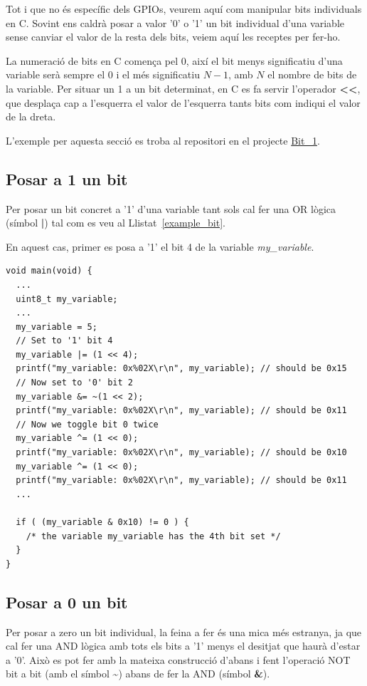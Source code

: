 Tot i que no és específic dels GPIOs, veurem aquí com manipular bits individuals en C. Sovint ens caldrà posar a valor '0' o '1' un bit individual d'una variable sense canviar el valor de la resta dels bits, veiem aquí les receptes per fer-ho.

\begin{remark}
 La numeració de bits en C comença pel 0, així el bit menys significatiu d'una variable serà sempre el 0 i el més significatiu $N-1$, amb $N$ el nombre de bits de la variable. Per situar un 1 a un bit determinat, en C es fa servir l'operador {\bf <{}<}, que desplaça cap a l'esquerra el valor de l'esquerra tants bits com indiqui el valor de la dreta.
\end{remark}

L'exemple per aquesta secció es troba al repositori en el projecte \href{https://github.com/mariusmm/cursembedded/tree/master/Simplicity/Bit_1}{Bit\_1}.
\index{|}
\subsection{Posar a 1 un bit}
Per posar un bit concret a '1' d'una variable tant sols cal fer una OR lògica (símbol {\bf |}) tal com es veu al Llistat~\ref{example_bit}.

En aquest cas, primer es posa a '1' el bit 4 de la variable {\em my\_variable}.
\begin{lstlisting}[style=customc, label=example_bit, caption=Manipulant un bit concret d'una variable]
void main(void) {
  ...
  uint8_t my_variable;
  ...
  my_variable = 5;
  // Set to '1' bit 4
  my_variable |= (1 << 4);
  printf("my_variable: 0x%02X\r\n", my_variable); // should be 0x15
  // Now set to '0' bit 2
  my_variable &= ~(1 << 2);
  printf("my_variable: 0x%02X\r\n", my_variable); // should be 0x11
  // Now we toggle bit 0 twice
  my_variable ^= (1 << 0);
  printf("my_variable: 0x%02X\r\n", my_variable); // should be 0x10
  my_variable ^= (1 << 0);
  printf("my_variable: 0x%02X\r\n", my_variable); // should be 0x11
  ...
  
  if ( (my_variable & 0x10) != 0 ) {
    /* the variable my_variable has the 4th bit set */
  }
}
\end{lstlisting}

\index{\&}\index{\~{}}
\subsection{Posar a 0 un bit}
Per posar a zero un bit individual, la feina a fer és una mica més estranya, ja que cal fer una AND lògica amb tots els bits a '1' menys el desitjat que haurà d'estar a '0'. Això es pot fer amb la mateixa construcció d'abans i fent l'operació NOT bit a bit (amb el símbol {\bf \~{}}) abans de fer la AND (símbol {\bf \&}).

